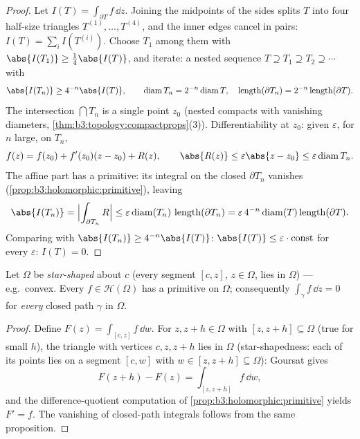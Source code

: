 \begin{proof}
Let $I(T) = \int_{\partial T}f\,\dd z$. Joining the midpoints
of the sides splits $T$ into four half-size triangles $T^{(1)},
\dots, T^{(4)}$, and the inner edges cancel in pairs: $I(T) =
\sum_iI(T^{(i)})$. Choose $T_1$ among them with
$\abs{I(T_1)} \geq \frac14\abs{I(T)}$, and iterate: a nested
sequence $T \supseteq T_1 \supseteq T_2 \supseteq\cdots$ with
\[
\abs{I(T_n)} \geq 4^{-n}\abs{I(T)},
\qquad
\operatorname{diam}T_n = 2^{-n}\operatorname{diam}T,
\quad
\operatorname{length}(\partial T_n) =
2^{-n}\operatorname{length}(\partial T).
\]
The intersection $\bigcap T_n$ is a single point $z_0$
(nested compacts with vanishing diameters,
\cref{thm:b3:topology:compactprops}(3)). Differentiability at
$z_0$: given $\varepsilon$, for $n$ large, on $T_n$,
\[
f(z) = f(z_0) + f'(z_0)(z - z_0) + R(z),
\qquad \abs{R(z)} \leq \varepsilon\abs{z - z_0} \leq
\varepsilon\operatorname{diam}T_n .
\]
The affine part has a primitive: its integral on the closed
$\partial T_n$ vanishes (\cref{prop:b3:holomorphic:primitive}),
leaving
\[
\abs{I(T_n)} = \Bigl|\int_{\partial T_n}R\Bigr|
\leq \varepsilon\operatorname{diam}(T_n)\,
\operatorname{length}(\partial T_n)
= \varepsilon\,4^{-n}\operatorname{diam}(T)
\operatorname{length}(\partial T) .
\]
Comparing with $\abs{I(T_n)} \geq 4^{-n}\abs{I(T)}$:
$\abs{I(T)} \leq \varepsilon\cdot\text{const}$ for every
$\varepsilon$: $I(T) = 0$.
\end{proof}

\begin{theorem}
\label{thm:b3:holomorphic:cauchy}
Let $\Omega$ be \emph{star-shaped} about $c$ (every segment
$[c, z]$, $z \in \Omega$, lies in $\Omega$) --- e.g.\ convex.
Every $f \in \mathcal H(\Omega)$ has a primitive on $\Omega$;
consequently $\int_\gamma f\,\dd z = 0$ for \emph{every}
closed path $\gamma$ in $\Omega$.
\end{theorem}

\begin{proof}
Define $F(z) = \int_{[c,z]}f\,\dd w$. For $z, z + h \in
\Omega$ with $[z, z+h] \subseteq \Omega$ (true for small $h$),
the triangle with vertices $c, z, z+h$ lies in $\Omega$
(star-shapedness: each of its points lies on a segment $[c,
w]$ with $w \in [z, z+h] \subseteq \Omega$): Goursat gives
\[
F(z + h) - F(z) = \int_{[z, z+h]}f\,\dd w,
\]
and the difference-quotient computation of
\cref{prop:b3:holomorphic:primitive} yields $F' = f$. The
vanishing of closed-path integrals follows from the same
proposition.
\end{proof}

